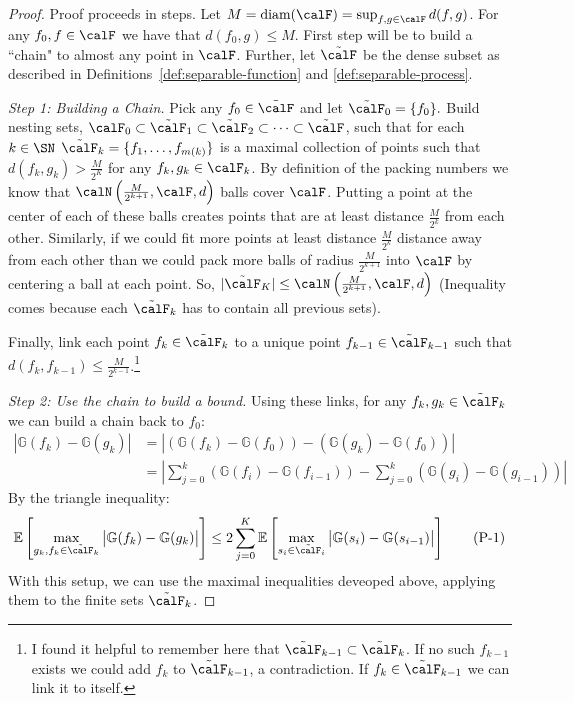 \begin{proof}
	Proof proceeds in steps. Let \(M = \text{diam}(\calF) = \sup_{f,g\in\calF}d(f,g)\). For any  \(f_0,f \in \calF\) we have that  \(d(f_0,g)\leq M\).	First step will be to build a ``chain" to almost any point in \(\calF\). Further, let \(\tilde\calF\) be the dense subset as described in Definitions~\ref{def:separable-function} and \ref{def:separable-process}.

	\emph{Step 1: Building a Chain.} Pick any \(f_0 \in\tilde\calF\) and let  \(\tilde\calF_0 = \{f_0\}.\) Build nesting sets, \(\calF_0 \subset\tilde\calF_1\subset\tilde\calF_2\subset\dots\subset\tilde\calF\), such that for each \(k\in\SN\)  \(\tilde\calF_k = \{f_1,\dots,f_{m(k)}\}\) is a maximal collection of points such that \(d(f_k,g_k) > \frac{M}{2^K} \) for any \(f_k,g_k\in\calF_k\). By definition of the packing numbers we know that  \(\calN\left(\frac{M}{2^{k+1}},\calF,d\right)\) balls cover \(\calF\). Putting a point at the center of each of these balls creates points that are at least distance \(\frac{M}{2^k}\) from each other. Similarly, if we could fit more points at least distance \(\frac{M}{2^{k}}\) distance away from each other than we could pack more balls of radius \(\frac{M}{2^{k+1}}\) into \(\calF\) by centering a ball at each point. So, \(|\tilde\calF_K| \leq \calN\left(\frac{M}{2^{k+1}},\calF,d
	\right)\) (Inequality comes because each \(\tilde\calF_k\) has to contain all previous sets). 

	Finally, link each point \(f_k \in \tilde\calF_k\) to a unique point  \(f_{k-1}\in\tilde\calF_{k-1}\) such that \(d(f_k,f_{k-1})\leq \frac{M}{2^{k-1}}\).\footnote{I found it helpful to remember here that \(\tilde\calF_{k-1}\subset\tilde\calF_k\). If no such \(f_{k-1}\) exists we could add  \(f_k\) to  \(\tilde\calF_{k-1}\), a contradiction. If  \(f_k \in \tilde\calF_{k-1}\) we can link it to itself. }

	\emph{Step 2: Use the chain to build a bound.} Using these links, for any \(f_k, g_k\in\tilde\calF_k\) we can build a chain back to \(f_0\):
	\begin{align*}
		\left|\mathbb{G}(f_k)-\mathbb{G}(g_k)\right|
		&=\left|\left(\mathbb{G}(f_k)-\mathbb{G}(f_0)\right) - \left(\mathbb{G}(g_k)-\mathbb{G}(f_0)\right)\right| \\
		&= \left|\sum_{j=0}^k\left(\mathbb{G}(f_i)-\mathbb{G}(f_{i-1})\right)-\sum_{j=0}^k \left(\mathbb{G}(g_i)-\mathbb{G}(g_{i-1})\right)\right|
	\end{align*}
	By the triangle inequality:
	\begin{equation}
		\label{eq:step2}
		\E\left[\max_{g_k,f_k\in\tilde\calF_k}\left|\mathbb{G}(f_k)-\mathbb{G}(g_k)\right|\right]
		\leq 2\sum_{j=0}^K \E\left[\max_{s_i\in\tilde\calF_i}\left|\mathbb{G}(s_i)-\mathbb{G}(s_{i-1})\right|\right]\tag{P-1}
	\end{equation}	
	With this setup, we can use the maximal inequalities deveoped above, applying them to the finite sets \(\tilde\calF_k\).


\end{proof}
